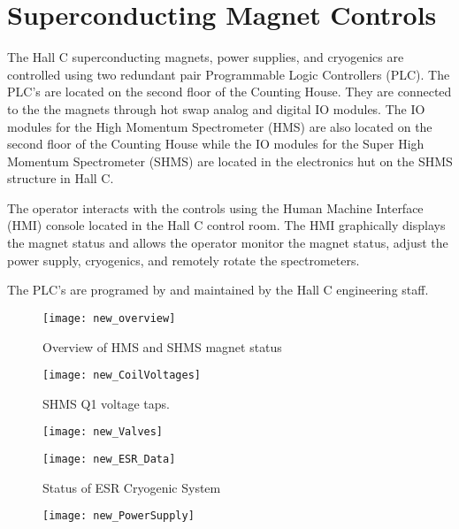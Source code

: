 \section{Superconducting Magnet Controls}

The Hall C superconducting magnets, power supplies, and cryogenics are
controlled using two redundant pair Programmable Logic Controllers
(PLC). The PLC's are located on the second floor of the Counting
House. They are connected to the the magnets through hot swap analog
and digital IO modules. The IO modules for the High Momentum
Spectrometer (HMS) are also located on the second floor of the
Counting House while the IO modules for the Super High Momentum
Spectrometer (SHMS) are located in the electronics hut on the SHMS
structure in Hall C.

The operator interacts with the controls using the Human Machine
Interface (HMI) console located in the Hall C control room. The HMI
graphically displays the magnet status and allows the operator monitor
the magnet status, adjust the power supply, cryogenics, and remotely
rotate the spectrometers.

The PLC's are programed by and maintained by the Hall C engineering
staff.


\begin{figure}
\texttt{[image: new\_overview]}
\caption{\label{fig:magc_overview}Overview of HMS and SHMS magnet status}
\end{figure}

\begin{figure}
\texttt{[image: new\_CoilVoltages]}
\caption{\label{fig:magc_coilvoltages}SHMS Q1 voltage taps.}
\end{figure}


\begin{figure}
\texttt{[image: new\_Valves]}
\caption{\label{fig:magc_valves}}
\end{figure}


\begin{figure}
\texttt{[image: new\_ESR\_Data]}
\caption{\label{fig:magc_ESR_Data}Status of ESR Cryogenic System}
\end{figure}


\begin{figure}
\texttt{[image: new\_PowerSupply]}
\caption{\label{fig:magc_PowerSupply}}
\end{figure}


